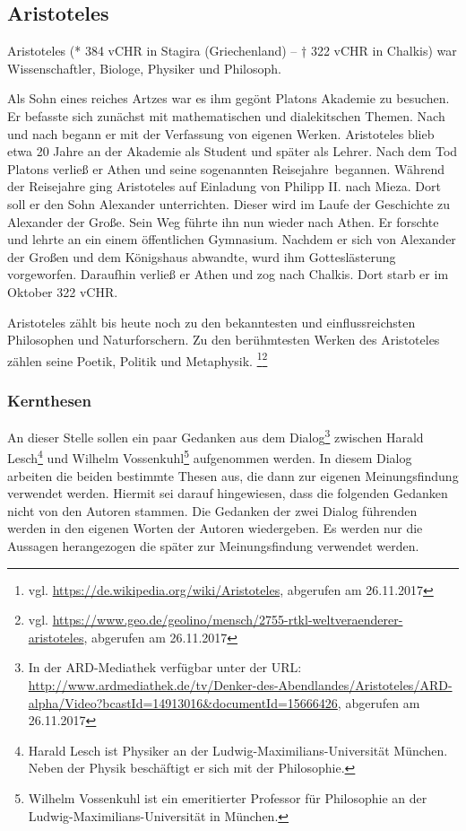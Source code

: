 \subsection{Aristoteles}
Aristoteles (* 384 \ac{vCHR} in Stagira (Griechenland) – † 322 \ac{vCHR} in Chalkis) war Wissenschaftler, Biologe, Physiker und Philosoph. 

Als Sohn eines reiches Artzes war es ihm gegönt Platons Akademie zu besuchen. Er befasste sich zunächst mit mathematischen und dialekitschen Themen. Nach und nach begann er mit der Verfassung von eigenen Werken. Aristoteles blieb etwa 20 Jahre an der Akademie als Student und später als Lehrer. Nach dem Tod Platons verließ er Athen und seine sogenannten \glqq Reisejahre\grqq\ begannen. Während der Reisejahre ging Aristoteles auf Einladung von Philipp II. nach Mieza. Dort soll er den Sohn Alexander unterrichten. Dieser wird im Laufe der Geschichte zu Alexander der Große. Sein Weg führte ihn nun wieder nach Athen. Er forschte und lehrte an ein einem öffentlichen Gymnasium. Nachdem er sich von Alexander der Großen und dem Königshaus abwandte, wurd ihm Gotteslästerung vorgeworfen. Daraufhin verließ er Athen und zog nach Chalkis. Dort starb er im Oktober 322 \ac{vCHR}. 

Aristoteles zählt bis heute noch zu den bekanntesten und einflussreichsten Philosophen und Naturforschern. Zu den berühmtesten Werken des Aristoteles zählen seine Poetik, Politik und Metaphysik.
\footnote{vgl. \url{https://de.wikipedia.org/wiki/Aristoteles}, abgerufen am 26.11.2017}\footnote{vgl. \url{https://www.geo.de/geolino/mensch/2755-rtkl-weltveraenderer-aristoteles}, abgerufen am 26.11.2017}


\subsubsection{Kernthesen}

An dieser Stelle sollen ein paar Gedanken aus dem Dialog\footnote{In der ARD-Mediathek verfügbar unter der URL: \url{http://www.ardmediathek.de/tv/Denker-des-Abendlandes/Aristoteles/ARD-alpha/Video?bcastId=14913016&documentId=15666426}, abgerufen am 26.11.2017} zwischen Harald Lesch\footnote{Harald Lesch ist Physiker an der Ludwig-Maximilians-Universität München. Neben der Physik beschäftigt er sich mit der Philosophie.} und Wilhelm Vossenkuhl\footnote{Wilhelm Vossenkuhl ist ein emeritierter Professor für Philosophie an der Ludwig-Maximilians-Universität in München.} aufgenommen werden. In diesem Dialog arbeiten die beiden bestimmte Thesen aus, die dann zur eigenen Meinungsfindung verwendet werden. Hiermit sei darauf hingewiesen, dass die folgenden Gedanken nicht von den Autoren stammen. Die Gedanken der zwei Dialog führenden werden in den eigenen Worten der Autoren wiedergeben. Es werden nur die Aussagen herangezogen die später zur Meinungsfindung verwendet werden.

